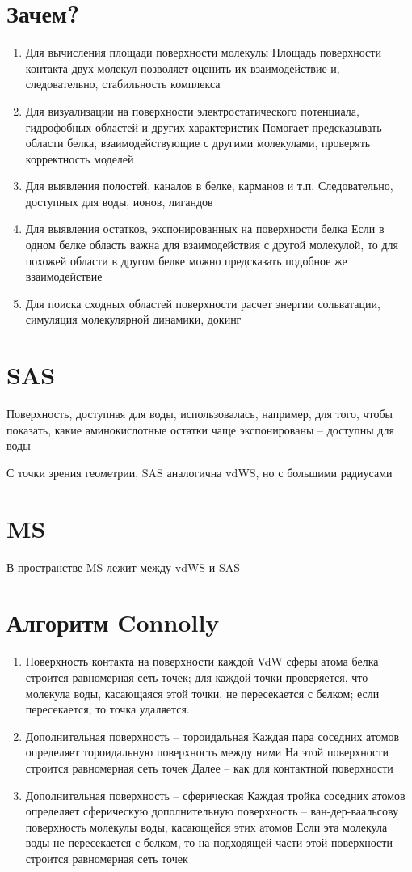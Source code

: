 \documentclass[a4paper,12pt]{article}
\begin{document}
\section{Зачем?}
\begin{enumerate}
\item Для вычисления площади поверхности молекулы
Площадь поверхности контакта двух молекул позволяет оценить
их взаимодействие и, следовательно, стабильность комплекса
\item Для визуализации на поверхности электростатического потенциала,
гидрофобных областей и других характеристик
Помогает предсказывать области белка, взаимодействующие с
другими молекулами, проверять корректность моделей
\item Для выявления полостей, каналов в белке, карманов и т.п.
Следовательно, доступных для воды, ионов, лигандов
\item Для выявления остатков, экспонированных на поверхности белка
Если в одном белке область важна для взаимодействия с
другой молекулой, то для похожей области в другом белке
можно предсказать подобное же взаимодействие
\item Для поиска сходных областей поверхности
расчет энергии сольватации,  симуляция молекулярной динамики, докинг
\end{enumerate}

\section{SAS}
Поверхность, доступная для воды, использовалась, например, для того,
чтобы показать, какие аминокислотные остатки чаще экспонированы --
доступны для воды

С точки зрения геометрии, SAS аналогична vdWS, но с большими радиусами

\section{MS}
В пространстве MS лежит между vdWS и SAS

\section{Алгоритм Connolly}
\begin{enumerate}
\item Поверхность контакта
на поверхности каждой VdW сферы атома белка строится
равномерная сеть точек;
для каждой точки проверяется, что молекула воды,
касающаяся этой точки, не пересекается с белком;
если пересекается, то точка удаляется.
\item Дополнительная поверхность -- тороидальная
Каждая пара соседних атомов определяет тороидальную поверхность
между ними
На этой поверхности строится равномерная сеть точек
Далее – как для контактной поверхности
\item Дополнительная поверхность -- сферическая
Каждая тройка соседних атомов определяет сферическую
дополнительную поверхность -- ван-дер-ваальсову поверхность
молекулы воды, касающейся этих атомов
Если эта молекула воды не пересекается с белком, то на
подходящей части этой поверхности строится равномерная сеть точек
\end{enumerate}
\end{document}
